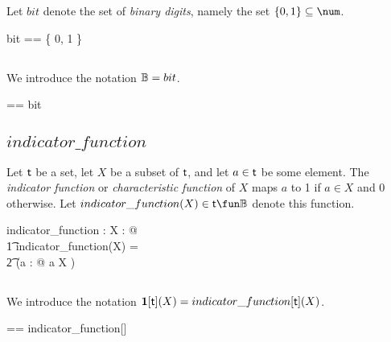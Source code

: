 \documentclass[11pt, oneside]{article}
\begin{document}
Let $bit$ denote the set of \textit{binary digits}, namely the set $\{ 0, 1\} \subseteq \num$.

\begin{zed}
	bit == \{ 0, 1 \}
\end{zed}

\subsection{}

We introduce the notation $\mathbb{B} = bit$.

\begin{zed}
	\B == bit
\end{zed}

\subsection{$indicator\_function$}

Let $\mathsf{t}$ be a set, 
let $X$ be a subset of $\mathsf{t}$, and 
let $a \in \mathsf{t}$ be some element.
The \textit{indicator function} or \textit{characteristic function} of $X$ maps $a$ to 1 if $a \in X$ and 0 otherwise.
Let $indicator\_function(X) \in \genT \fun \B$ denote this function.

\begin{gendef}[\genT]
	indicator\_function : \power \genT \fun \genT \fun \B
\where
	\forall X : \power \genT @ \\
		\t1 indicator\_function(X) = \\
			\t2 (\lambda a : \genT @ \IF a \in X  )
\end{gendef}

\subsection{}

We introduce the notation $\mathbf{1}[\mathsf{t}](X) = indicator\_function[\mathsf{t}](X)$.

\begin{zed}
	\indF[\genT] == indicator\_function[\genT]
\end{zed}

\printbibliography
\end{document}
